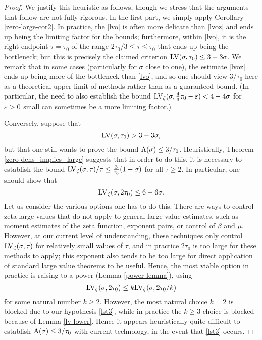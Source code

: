 \begin{proof}
We justify this heuristic as follows, though we stress that the arguments that follow are not fully rigorous.  In the first part, we simply apply Corollary \ref{zero-large-cor2}.  In practice, the \eqref{lvo} is often more delicate than \eqref{lvoz} and ends up being the limiting factor for the bounds; furthermore, within \eqref{lvo}, it is the right endpoint $\tau=\tau_0$ of the range $2\tau_0/3 \leq \tau \leq \tau_0$ that ends up being the bottleneck; but this is precisely the claimed criterion $\mathrm{LV}(\sigma, \tau_0) \leq 3-3\sigma$.  We remark that in some cases (particularly for $\sigma$ close to one), the estimate \eqref{lvoz} ends up being more of the bottleneck than \eqref{lvo}, and so one should view $3/\tau_0$ here as a theoretical upper limit of methods rather than as a guaranteed bound.  (In particular, the need to also establish the bound $\mathrm{LV}_\zeta(\sigma, \frac{4}{3}\tau_0-\varepsilon) < 4-4\sigma$ for $\varepsilon>0$ small can sometimes be a more limiting factor.)

Conversely, suppose that
\begin{equation}\label{lst3}
    \mathrm{LV}(\sigma,\tau_0) > 3-3\sigma,
\end{equation}
but that one still wants to prove the bound $\mathrm{A}(\sigma) \leq 3/\tau_0$. Heuristically, Theorem \ref{zero-dens_implies_large} suggests that in order to do this, it is necessary to establish the bound $\mathrm{LV}_\zeta(\sigma,\tau)/\tau \leq \frac{3}{\tau_0}(1-\sigma)$ for all $\tau \geq 2$.  In particular, one should show that
$$ \mathrm{LV}_\zeta(\sigma,2\tau_0) \leq 6-6\sigma.$$
Let us consider the various options one has to do this.  There are ways to control zeta large values that do not apply to general large value estimates, such as moment estimates of the zeta function, exponent pairs, or control of $\beta$ and $\mu$.  However, at our current level of understanding, these techniques only control $\mathrm{LV}_\zeta(\sigma,\tau)$ for relatively small values of $\tau$, and in practice $2\tau_0$ is too large for these methods to apply; this exponent also tends to be too large for direct application of standard large value theorems to be useful.  Hence, the most viable option in practice is raising to a power (Lemma \ref{power-lemma}), using
$$ \mathrm{LV}_\zeta(\sigma,2\tau_0) \leq k \mathrm{LV}_\zeta(\sigma,2\tau_0/k)$$
for some natural number $k \geq 2$.  However, the most natural choice $k=2$ is blocked due to our hypothesis \eqref{lst3}, while in practice the $k \geq 3$ choice is blocked because of Lemma \ref{lv-lower}.  Hence it appears heuristically quite difficult to establish $\mathrm{A}(\sigma) \leq 3/\tau_0$ with current technology, in the event that \eqref{lst3} occurs.


\end{proof}
